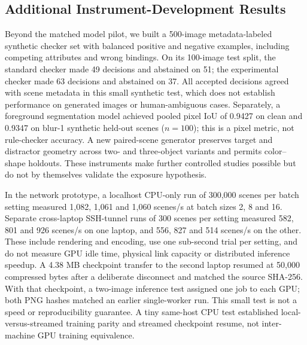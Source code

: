 \documentclass{article}
\begin{document}
\subsection{Additional Instrument-Development Results}
Beyond the matched model pilot, we built a 500-image metadata-labeled synthetic checker set with balanced positive and negative examples, including competing attributes and wrong bindings. On its 100-image test split, the standard checker made 49 decisions and abstained on 51; the experimental checker made 63 decisions and abstained on 37. All accepted decisions agreed with scene metadata in this small synthetic test, which does not establish performance on generated images or human-ambiguous cases. Separately, a foreground segmentation model achieved pooled pixel IoU of 0.9427 on clean and 0.9347 on blur-1 synthetic held-out scenes ($n=100$); this is a pixel metric, not rule-checker accuracy. A new paired-scene generator preserves target and distractor geometry across two- and three-object variants and permits color--shape holdouts. These instruments make further controlled studies possible but do not by themselves validate the exposure hypothesis.

In the network prototype, a localhost CPU-only run of 300,000 scenes per batch setting measured 1,082, 1,061 and 1,060 scenes/s at batch sizes 2, 8 and 16. Separate cross-laptop SSH-tunnel runs of 300 scenes per setting measured 582, 801 and 926 scenes/s on one laptop, and 556, 827 and 514 scenes/s on the other. These include rendering and encoding, use one sub-second trial per setting, and do not measure GPU idle time, physical link capacity or distributed inference speedup. A 4.38 MB checkpoint transfer to the second laptop resumed at 50,000 compressed bytes after a deliberate disconnect and matched the source SHA-256. With that checkpoint, a two-image inference test assigned one job to each GPU; both PNG hashes matched an earlier single-worker run. This small test is not a speed or reproducibility guarantee. A tiny same-host CPU test established local-versus-streamed training parity and streamed checkpoint resume, not inter-machine GPU training equivalence.
\end{document}
